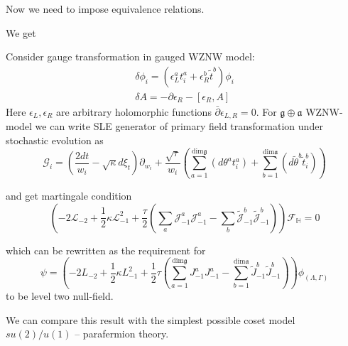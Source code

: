 \documentclass[a4paper]{jpconf}
\theoremstyle{definition}
\newcommand{\gf}{\mathfrak{g}}
\newcommand{\af}{\mathfrak{a}}
\theoremstyle{definition} \newtheorem{Def}{Definition}
\begin{document}
Now we need to impose equivalence relations.


We get 


Consider gauge transformation in gauged WZNW model:
\begin{eqnarray*}
  \delta \phi_{i}=(\epsilon_{L}^{a} t^{a}_{i}+\epsilon^{b}_{R}\tilde{t}^{b})\phi_{i}\\
  \delta A = -\partial \epsilon_{R}-[\epsilon_{R},A]
\end{eqnarray*}
Here $\epsilon_{L}, \epsilon_{R}$ are arbitrary holomorphic functions $\bar\partial\epsilon_{L,R}=0$. 
For  $\gf\oplus \af$ WZNW-model we can write SLE generator of primary field transformation under stochastic evolution as
\begin{equation*}
  \mathcal{G}_{i}=\left(\frac{2dt}{w_{i}}-\sqrt{\kappa} d\xi_{t}\right) \partial_{w_{i}}+\frac{\sqrt{\tau}}{w_{i}}\left(\sum_{a=1}^{\mathrm{dim} \gf}\left(d \theta ^{a} t^{a}_{i}\right)+\sum_{b=1}^{\mathrm{dim} \af}\left(d \tilde{\theta} ^{b} \tilde{t}^{b}_{i}\right)\right)
\end{equation*}


and get martingale condition
\begin{equation*}
  \left(-2 \mathcal{L}_{-2}+\frac{1}{2}\kappa \mathcal{L}_{-1}^{2}+\frac{\tau}{2}\left( \sum_{a} \mathcal{J}^{a}_{-1} \mathcal{J}^{a}_{-1}-
      \sum_{b}\tilde{\mathcal{J}}^{b}_{-1} \tilde{\mathcal{J}}^{b}_{-1}\right)\right)        \mathcal{F}_{\mathbb{H}}=0
\end{equation*}

which can be rewritten as the requirement for
\begin{equation*}
  \psi=\left(-2L_{-2}+\frac{1}{2}\kappa L_{-1}^{2}+\frac{1}{2}\tau \left(\sum_{a=1}^{\mathrm{dim}\gf}J^{a}_{-1}J^{a}_{-1}-\sum_{b=1}^{\mathrm{dim}\af}\tilde{J}^{b}_{-1}\tilde{J}^{b}_{-1}\right)\right) \phi_{(\Lambda,\Gamma)}
\end{equation*}
to be level two null-field.

We can compare this result with the simplest possible coset model $su(2)/u(1)$ --  parafermion theory.
\end{document}
